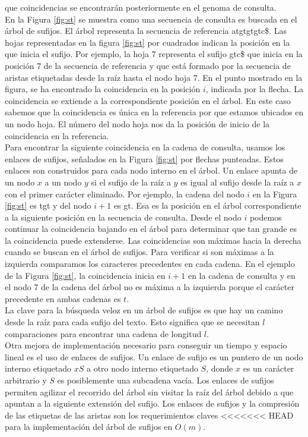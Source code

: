 \documentclass[12pt,a4paper]{article}
\begin{document}
que coincidencias se encontrarán posteriormente en el genoma de consulta.\\
\indent
En la Figura \ref{fig:st} se muestra como una secuencia de consulta es buscada en el árbol de sufijos. El
árbol representa la secuencia de referencia atgtgtgtc\$. Las hojas representadas en la figura \ref{fig:st} por cuadrados indican la
posición en la que inicia el sufijo. Por ejemplo, la hoja 7 representa el sufijo gtc\$ que inicia en la 
posición 7 de la secuencia de referencia y que está formado por la secuencia de aristas etiquetadas desde la
raíz hasta el nodo hoja 7. En el punto mostrado en la figura, se ha encontrado la coincidencia en la posición $i$,
indicada por la flecha. La coincidencia se extiende a la correspondiente posición en el árbol. En este caso sabemos
que la coincidencia es única en la referencia por que estamos ubicados en un nodo hoja. El número del nodo hoja
nos da la posición de inicio de la coincidencia en la referencia.\\
\indent
Para encontrar la siguiente coincidencia en la cadena de consulta, usamos los enlaces de sufijos, señalados en la Figura \ref{fig:st} por
flechas punteadas. Estos enlaces son construidos para cada nodo interno en el árbol. Un enlace apunta de un nodo
$x$ a un nodo $y$ si el sufijo de la raíz a $y$ es igual al sufijo desde la raíz a $x$ con el primer carácter 
eliminado. Por ejemplo, la cadena del nodo $i$ en la Figura \ref{fig:st} es tgt y del nodo $i+1$ es gt. Esa es la
posición en el árbol correspondiente a la siguiente posición en la secuencia de consulta. Desde el nodo $i$ podemos
continuar la coincidencia bajando en el árbol para determinar que tan grande es la coincidencia puede extenderse. Las 
coincidencias son máximas hacia la derecha cuando se buscan en el árbol de sufijos. Para verificar si son máximas a
la izquierda comparamos los caracteres precedentes en cada cadena. En el ejemplo de la Figura \ref{fig:st}, la
coincidencia inicia en $i+1$ en la cadena de consulta y en el nodo 7 de la cadena del árbol no es máxima a la izquierda
porque el carácter precedente en ambas cadenas es $t$.\\
\indent
La clave para la búsqueda veloz en un árbol de sufijos es que 
hay un camino desde la raíz para cada sufijo del texto. Esto significa que se 
necesitan $l$ comparaciones para encontrar una cadena de longitud $l$.\\
\indent
Otra mejora de implementación necesario para conseguir un tiempo y espacio 
lineal es el uso de enlaces de sufijos. Un enlace de sufijo es un puntero de un 
nodo interno etiquetado $xS$ a otro nodo interno etiquetado $S$, donde $x$ es un 
carácter arbitrario y $S$ es posiblemente una subcadena vacía. Los enlaces de 
sufijos permiten agilizar el recorrido del árbol sin visitar la raíz del árbol 
debido a que apuntan a la siguiente extensión del sufijo. Los enlaces de sufijos 
y la compresión de las etiquetas de las aristas son los requerimientos claves 
<<<<<<< HEAD
para la implementación del árbol de sufijos en $O(m)$.\\
\end{document}
